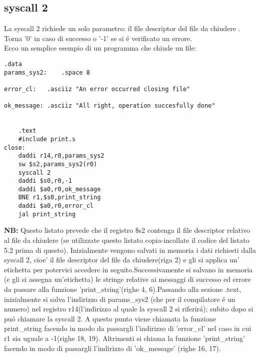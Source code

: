 \documentclass[12pt]{report}
\newcommand{\OF}{\textbf{NB:} Questo listato prevede che il registro \$s2 contenga il file descriptor
relativo al file da chiudere (se utilizzate questo listato copia-incollate il codice del listato 5.2 prima di questo).}
\begin{document}
\subsection{syscall 2}
La syscall 2 richiede un solo parametro: il file descriptor del file da chiudere .\\
Torna '0' in caso di successo o '-1' se si \'{e} verificato un errore.\\ 
Ecco un semplice esempio di un programma che chiude un file:
\begin{lstlisting}[caption={syscall2}, label={code:syscall2}, style={mips}]
      		.data
params_sys2:	.space 8

error_cl:	.asciiz "An error occurred closing file"

ok_message:	.asciiz "All right, operation succesfully done"						


	.text
	#include print.s	
close:	
	daddi r14,r0,params_sys2		
	sw $s2,params_sys2(r0)	
	syscall 2			
	daddi $s0,r0,-1		
	daddi $a0,r0,ok_message		
	BNE r1,$s0,print_string		
	daddi $a0,r0,error_cl	
	jal print_string			
\end{lstlisting}
\OF{}
Inizialmente vengono salvati in memoria i dati richiesti dalla syscall 2, cioe'  il file descriptor del file da chiudere(riga 2) e gli si applica un' etichetta
 per potervici accedere in seguito.Successivamente si salvano in memoria (e gli si assegna un'etichetta) le stringe relative ai messaggi 
di successo ed errore da passare alla funzione 'print\_string'(righe 4, 6).Passando alla sezione .text, inizialmente si salva l'indirizzo di params\_sys2
(che per il compilatore \'{e} un numero) nel registro r14(l'indirizzo al quale la syscall 2 si riferir\'{a}); subito dopo si pu\'{o} chiamare la syscall 2.
A questo punto viene chiamata la funzione print\_string facendo in modo da passargli l'indirizzo di 'error\_cl' nel caso in cui r1 sia uguale a -1(righe 18, 19).
Altrimenti si chiama la funzione 'print\_string' facendo in modo di passargli l'indirizzo di 'ok\_message' (righe 16, 17).
\end{document}
